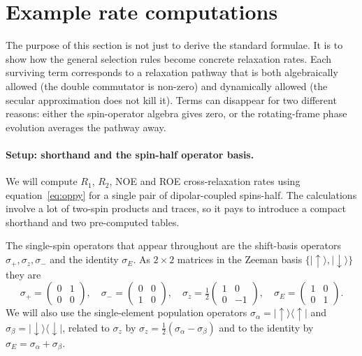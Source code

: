 \documentclass[notitlepage,11pt]{article}
\begin{document}
\section{Example rate computations}
\label{sec:ex}

The purpose of this section is not just to derive the standard formulae. It is to show how the general selection rules become concrete relaxation rates. Each surviving term corresponds to a relaxation pathway that is both algebraically allowed (the double commutator is non-zero) and dynamically allowed (the secular approximation does not kill it). Terms can disappear for two different reasons: either the spin-operator algebra gives zero, or the rotating-frame phase evolution averages the pathway away.

\paragraph{Setup: shorthand and the spin-half operator basis.} We will compute $R_1$, $R_2$, NOE and ROE cross-relaxation rates using equation~\ref{eq:oppy} for a single pair of dipolar-coupled spins-half. The calculations involve a lot of two-spin products and traces, so it pays to introduce a compact shorthand and two pre-computed tables.

The single-spin operators that appear throughout are the shift-basis operators $\sigma_+,\sigma_z,\sigma_-$ and the identity $\sigma_E$. As $2\times 2$ matrices in the Zeeman basis $\{|\!\uparrow\rangle,|\!\downarrow\rangle\}$ they are
\begin{equation}
\sigma_+=\begin{pmatrix}0&1\\0&0\end{pmatrix},\quad \sigma_-=\begin{pmatrix}0&0\\1&0\end{pmatrix},\quad \sigma_z=\tfrac{1}{2}\begin{pmatrix}1&0\\0&-1\end{pmatrix},\quad \sigma_E=\begin{pmatrix}1&0\\0&1\end{pmatrix}.
\end{equation}
We will also use the single-element population operators $\sigma_\alpha=|\!\uparrow\rangle\langle\uparrow|$ and $\sigma_\beta=|\!\downarrow\rangle\langle\downarrow|$, related to $\sigma_z$ by $\sigma_z=\tfrac{1}{2}(\sigma_\alpha-\sigma_\beta)$ and to the identity by $\sigma_E=\sigma_\alpha+\sigma_\beta$.
\end{document}
